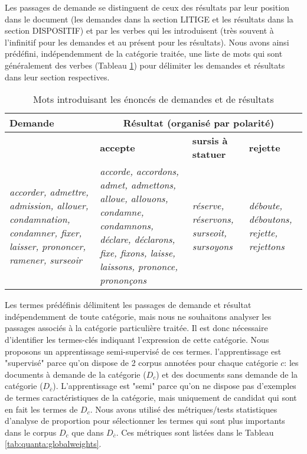 Les passages de demande se distinguent de ceux des résultats par leur position dans le document (les demandes dans la section LITIGE et les résultats dans la section DISPOSITIF) et par les verbes qui les introduisent (très souvent à l'infinitif pour les demandes et au présent pour les résultats). Nous avons ainsi prédéfini, indépendemment de la catégorie traitée, une liste de mots qui sont généralement des verbes (Tableau \ref{tab:quanta:mots-introductifs}) pour délimiter les demandes et résultats dans leur section respectives.

\begin{table}
\centering
\scriptsize
 \begin{tabular}{|p{}|p{}|p{}|p{}|}
 \hline
 \textbf{Demande} & \multicolumn{3}{c|}{\textbf{Résultat} (organisé par polarité)} \\ \hline
  & \textbf{accepte}  &\textbf{sursis à statuer} & \textbf{rejette}  \\ \hline
 \textit{accorder, admettre, admission, allouer, condamnation, condamner, fixer, laisser, prononcer, ramener, surseoir} & \textit{accorde, accordons, admet, admettons, alloue, allouons, condamne, condamnons, déclare, déclarons, fixe, fixons, laisse, laissons, prononce, prononçons} & \textit{réserve, réservons, surseoit, sursoyons} & \textit{déboute, déboutons, rejette, rejettons} \\ \hline
 \end{tabular}
  \caption{Mots introduisant les énoncés de demandes et de résultats}\label{tab:quanta:mots-introductifs}
 \end{table}

Les termes prédéfinis délimitent les passages de demande et résultat indépendemment de toute catégorie, mais nous ne souhaitons analyser les passages associés à la catégorie particulière traitée. Il est donc nécessaire d'identifier les termes-clés indiquant l'expression de cette catégorie. Nous proposons un apprentissage semi-supervisé de ces termes. l'apprentissage est "supervisé" parce qu'on dispose de 2 corpus annotées pour chaque catégorie $c$: les documents à demande de la catégorie ($D_c$) et des documents sans demande de la catégorie ($D_{\overline{c}}$). L'apprentissage est "semi" parce qu'on ne dispose pas d'exemples de termes caractéristiques de la catégorie, mais uniquement de candidat qui sont en fait les termes de $D_c$. Nous avons utilisé des métriques/tests statistiques d'analyse de proportion pour sélectionner les termes qui sont plus importants dans le corpus $D_c$ que dans $D_{\overline{c}}$. Ces métriques sont listées dans le Tableau \ref{tab:quanta:globalweights}.

